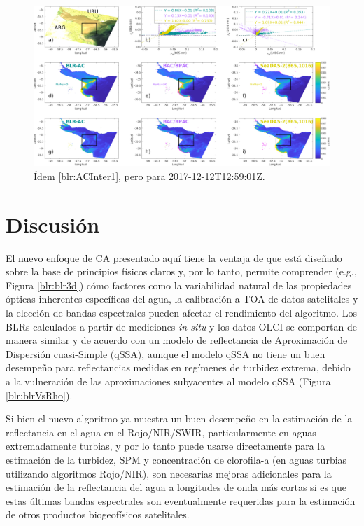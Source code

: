             \begin{figure}
            \centering
            \includegraphics[width=\textwidth]{blr/figures/ACInter3.png}
            \caption{Ídem \ref{blr:ACInter1}, pero para 2017-12-12T12:59:01Z.}
            \label{blr:ACInter3}
            \end{figure}

\section{Discusión}
\label{blr:s:discussion}

    El nuevo enfoque de CA presentado aquí tiene la ventaja de que está diseñado sobre la base de principios físicos claros y, por lo tanto, permite comprender (e.g., Figura \ref{blr:blr3d}) cómo factores como la variabilidad natural de las propiedades ópticas inherentes específicas del agua, la calibración a TOA de datos satelitales y la elección de bandas espectrales pueden afectar el rendimiento del algoritmo. Los BLRs calculados a partir de mediciones \textit{in situ} y los datos OLCI se comportan de manera similar y de acuerdo con un modelo de reflectancia de Aproximación de Dispersión cuasi-Simple (qSSA), aunque el modelo qSSA no tiene un buen desempeño para reflectancias medidas en regímenes de turbidez extrema, debido a la vulneración de las aproximaciones subyacentes al modelo qSSA (Figura \ref{blr:blrVsRho}).
    
    Si bien el nuevo algoritmo ya muestra un buen desempeño en la estimación de la reflectancia en el agua en el Rojo/NIR/SWIR, particularmente en aguas extremadamente turbias, y por lo tanto puede usarse directamente para la estimación de la turbidez, SPM y concentración de clorofila-a (en aguas turbias utilizando algoritmos Rojo/NIR), son necesarias mejoras adicionales para la estimación de la reflectancia del agua a longitudes de onda más cortas si es que estas últimas bandas espectrales son eventualmente requeridas para la estimación de otros productos biogeofísicos satelitales.
    
